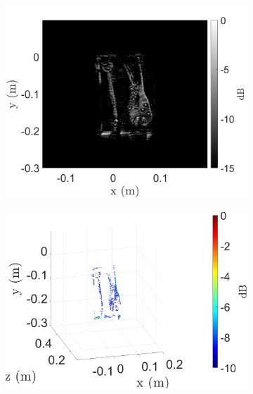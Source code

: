 \documentclass{ieeeaccess}
\begin{document}
\begin{figure}[h]
\centering
    \begin{subfigure}[b]{0.245\textwidth}
         \centering
         \includegraphics[width=\textwidth]{smith22.png} %
         \caption{}
         \label{fig:exp2_hiddentools_BPA_2D}
    \end{subfigure}
    \hfill
    \begin{subfigure}[b]{0.245\textwidth}
         \centering
         \includegraphics[width=\textwidth]{smith23.png} %
         \caption{}
         \label{fig:exp2_hiddentools_BPA_3D}
    \end{subfigure}
    \hfill
    \begin{subfigure}[b]{0.245\textwidth}

\end{subfigure}
\end{figure}
\end{document}
